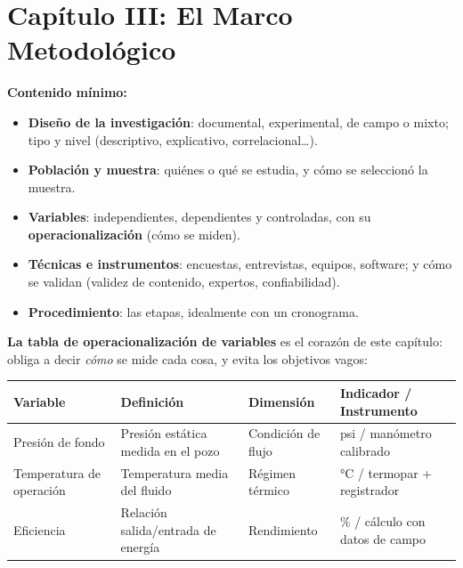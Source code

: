 \documentclass[12pt, letterpaper]{article}
\begin{document}
\section{Capítulo III: El Marco Metodológico}

\begin{cuadroteoria}
  \textbf{Contenido mínimo:}
  \begin{itemize}
    \item \textbf{Diseño de la investigación}: documental, experimental, de campo o mixto; tipo y nivel (descriptivo, explicativo, correlacional\ldots).
    \item \textbf{Población y muestra}: quiénes o qué se estudia, y cómo se seleccionó la muestra.
    \item \textbf{Variables}: independientes, dependientes y controladas, con su \textbf{operacionalización} (cómo se miden).
    \item \textbf{Técnicas e instrumentos}: encuestas, entrevistas, equipos, software; y cómo se validan (validez de contenido, expertos, confiabilidad).
    \item \textbf{Procedimiento}: las etapas, idealmente con un cronograma.
  \end{itemize}
\end{cuadroteoria}

\noindent\textbf{La tabla de operacionalización de variables} es el corazón de este capítulo: obliga a decir \emph{cómo} se mide cada cosa, y evita los objetivos vagos:

\begin{center}
  \small
  \renewcommand{\arraystretch}{1.35}
  \begin{tabular}{@{}>{\raggedright\arraybackslash}p{2.9cm}>{\raggedright\arraybackslash}p{4.4cm}>{\raggedright\arraybackslash}p{3.1cm}>{\raggedright\arraybackslash}p{4.9cm}@{}}
    \toprule
    \textbf{Variable} & \textbf{Definición} & \textbf{Dimensión} & \textbf{Indicador / Instrumento} \\
    \midrule
    Presión de fondo & Presión estática medida en el pozo & Condición de flujo & psi / manómetro calibrado \\
    Temperatura de operación & Temperatura media del fluido & Régimen térmico & $°\text{C}$ / termopar + registrador \\
    Eficiencia & Relación salida/entrada de energía & Rendimiento & $\%$ / cálculo con datos de campo \\
    \bottomrule
  \end{tabular}
\end{center}
\end{document}
